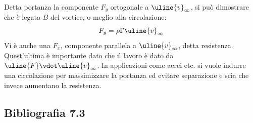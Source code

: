 Detta portanza la componente $F_y$ ortogonale a $\uline{v}_\infty$, si può dimostrare che è legata $B$ del vortice, o meglio alla circolazione:
%
	\begin{equation*}
		F_y = \rho \Gamma \uline{v}_\infty
	\end{equation*}
%
Vi è anche una $F_x$, componente parallela a $\uline{v}_\infty$, detta resistenza.
Quest'ultima è importante dato che il lavoro è dato da $\uline{F} \vdot \uline{v}_\infty$.
In applicazioni come aerei etc. si vuole indurre una circolazione per massimizzare la portanza ed evitare separazione e scia che invece aumentano la resistenza.

\subsection*{Bibliografia 7.3}
\cite[Cap.\ 10.4]{CengelCimbala}\\
\cite[Cap.\ 10.2, 10.3]{PnueliGutfinger}